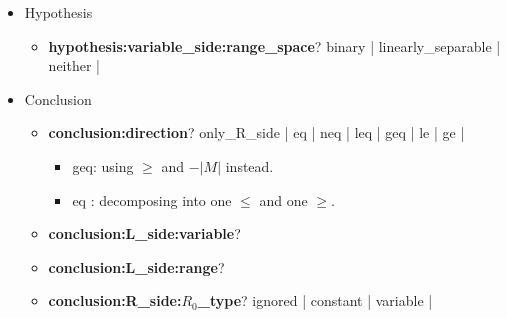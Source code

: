 \documentclass[onecolumn]{ctexart}
\begin{document}
\begin{itemize}
    \item  Hypothesis
    \begin{itemize}

        \item  \textbf{hypothesis:variable\_side:range\_space}? \qquad
            {\color{LimeGreen} binary}  |
            {\color{red}   linearly\_separable}  |
            {\color{red}   neither}  |

    \end{itemize}

    \item  Conclusion  %
    \begin{itemize}


        \item  \textbf{conclusion:direction}? \qquad
            {\color{red}       only\_R\_side}  |
            {\color{blue}      eq}   |
            {\color{red}       neq}  |
            {\color{LimeGreen} leq}  |
            {\color{blue}      geq}  |
            {\color{red}       le}   |
            {\color{red}       ge}   |

                \begin{itemize}
                    \item  {\color{blue}      geq}: using $\geq$ and $-|M|$ instead.
                    \item  {\color{blue}      eq }: decomposing into one $\leq$ and one $\geq$.
                \end{itemize}

        \item  \textbf{\color{gray} conclusion:L\_side:variable}? \qquad

        \item  \textbf{\color{gray} conclusion:L\_side:range}? \qquad


        \item  \textbf{conclusion:R\_side:$R_0$\_type}? \qquad \qquad \qquad \quad
            {\color{blue}      ignored}   |
            {\color{LimeGreen} constant}  |
            {\color{LimeGreen} variable}  |


\end{itemize}
\end{itemize}
\end{document}
